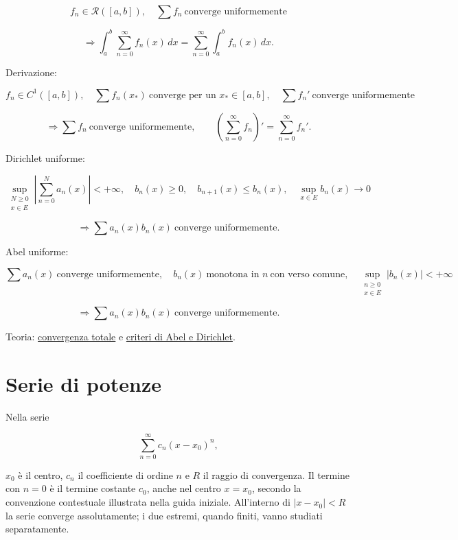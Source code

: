 \[
\displaystyle
f_n\in\mathcal R([a,b]),\quad
\sum f_n\ \text{converge uniformemente}
\]

\[
\displaystyle
\Longrightarrow
\int_a^b\sum_{n=0}^{\infty}f_n(x)\,dx
=
\sum_{n=0}^{\infty}\int_a^b f_n(x)\,dx.
\]

Derivazione:

\[
\displaystyle
f_n\in C^1([a,b]),\quad
\sum f_n(x_\ast)\ \text{converge per un }x_\ast\in[a,b],
\quad
\sum f_n'\ \text{converge uniformemente}
\]

\[
\displaystyle
\Longrightarrow
\sum f_n\ \text{converge uniformemente},
\qquad
\left(\sum_{n=0}^{\infty}f_n\right)'
=
\sum_{n=0}^{\infty}f_n'.
\]

Dirichlet uniforme:

\[
\displaystyle
\sup_{\substack{N\ge0\\x\in E}}
\left\lvert\sum_{n=0}^{N}a_n(x)\right\rvert<+\infty,
\quad
b_n(x)\ge0,
\quad
b_{n+1}(x)\le b_n(x),
\quad
\sup_{x\in E}b_n(x)\to0
\]

\[
\displaystyle
\Longrightarrow
\sum a_n(x)b_n(x)\ \text{converge uniformemente}.
\]

Abel uniforme:

\[
\displaystyle
\sum a_n(x)\ \text{converge uniformemente},
\quad
b_n(x)\ \text{monotona in }n\ \text{con verso comune},
\quad
\sup_{\substack{n\ge0\\x\in E}}\lvert b_n(x)\rvert<+\infty
\]

\[
\displaystyle
\Longrightarrow
\sum a_n(x)b_n(x)\ \text{converge uniformemente}.
\]

Teoria: \href{https://ingegnerismo.it/matematica/convergenza-totale/}{convergenza totale} e \href{https://ingegnerismo.it/matematica/criteri-di-abel-e-dirichlet/}{criteri di Abel e Dirichlet}.

\section{Serie di potenze}\label{serie-di-potenze}

Nella serie

\[
\displaystyle
\sum_{n=0}^{\infty}c_n(x-x_0)^n,
\]

\(x_0\) è il centro, \(c_n\) il coefficiente di ordine \(n\) e \(R\) il raggio di convergenza. Il termine con \(n=0\) è il termine costante \(c_0\), anche nel centro \(x=x_0\), secondo la convenzione contestuale illustrata nella guida iniziale. All'interno di \(|x-x_0|<R\) la serie converge assolutamente; i due estremi, quando finiti, vanno studiati separatamente.

